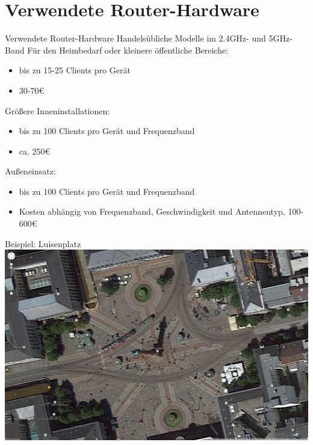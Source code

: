 \documentclass{beamer}
\begin{document}
\section{Verwendete Router-Hardware}
\begin{frame}{Verwendete Router-Hardware}
Handelsübliche Modelle im 2.4GHz- und 5GHz-Band
\vfill
Für den Heimbedarf oder kleinere öffentliche Bereiche:
\begin{itemize}
\item bis zu 15-25 Clients pro Gerät
\item 30-70\euro{}
\end{itemize}
\vfill

Größere Inneninstallationen:
\begin{itemize}
\item bis zu 100 Clients pro Gerät und Frequenzband
\item ca. 250\euro{}
\end{itemize}
\vfill

Außeneinsatz:
\begin{itemize}
\item bis zu 100 Clients pro Gerät und Frequenzband
\item Kosten abhängig von Frequenzband, Geschwindigkeit und Antennentyp, 100-600\euro{}
\end{itemize}
\vfill
\end{frame}

\begin{frame}{Beispiel: Luisenplatz}
\includegraphics[height=0.75\textheight]{images/plan_luisenplatz1.jpg}$\;$
\end{frame}
\end{document}
